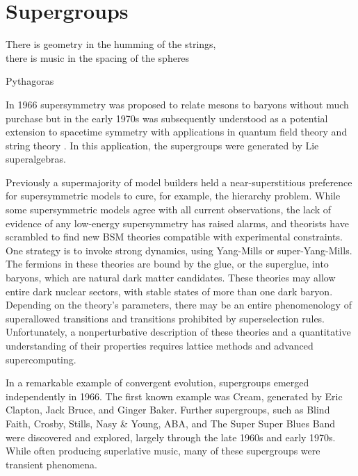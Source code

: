 \section{Supergroups}

\epigraph{There is geometry in the humming of the strings,\\
there is music in the spacing of the spheres}{Pythagoras}


In 1966 supersymmetry was proposed to relate mesons to baryons\cite{doi:10.1143/PTP.36.1266} without much purchase but in the early 1970s was subsequently understood as a potential extension to spacetime symmetry with applications in quantum field theory and string theory \cite{Gervais:1971ji,Ramond:1971gb,Volkov:1973ix,Wess:1974tw}.
In this application, the supergroups were generated by Lie superalgebras.

Previously a supermajority of model builders held a near-superstitious preference for supersymmetric models to cure, for example, the hierarchy problem.
While some supersymmetric models agree with all current observations\cite{fox:2005}, the lack of evidence of any low-energy supersymmetry has raised alarms, and theorists have scrambled to find new BSM theories compatible with experimental constraints.
One strategy is to invoke strong dynamics, using Yang-Mills or super-Yang-Mills.
The fermions in these theories are bound by the glue, or the superglue, into baryons, which are natural dark matter candidates.
These theories may allow entire dark nuclear sectors, with stable states of more than one dark baryon.
Depending on the theory's parameters, there may be an entire phenomenology of superallowed transitions and transitions prohibited by superselection rules.
Unfortunately, a nonperturbative description of these theories and a quantitative understanding of their properties requires lattice methods and advanced supercomputing\cite{Detmold:2014qqa,Detmold:2014kba}.

In a remarkable example of convergent evolution, supergroups emerged independently in 1966.
The first known example was Cream, generated by Eric Clapton, Jack Bruce, and Ginger Baker\cite{supergroups}.
Further supergroups, such as Blind Faith, Crosby, Stills, Nasy \& Young, ABA, and The Super Super Blues Band\cite{supersuperblues} were discovered and explored, largely through the late 1960s and early 1970s.
While often producing superlative music, many of these supergroups were transient phenomena.